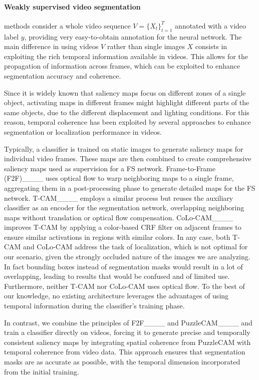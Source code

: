 \paragraph{Weakly supervised video segmentation} methods consider a whole video sequence \( V = \{X_t\}_{t=1}^T \) annotated with a video label $y$, providing very easy-to-obtain annotation for the neural network. The main difference in using videos $V$ rather than single images $X$ consists in exploiting the rich temporal information available in videos. This %
allows for the propagation of information across frames, which can be exploited to enhance segmentation accuracy and coherence.

Since it is widely known that saliency maps focus on different zones of a single object, activating maps in different frames might highlight different parts of the same objects, due to the different displacement and lighting conditions. For this reason, temporal coherence has been exploited by several approaches to enhance segmentation or localization performance in videos. 

Typically, a classifier is trained on static images to generate saliency maps for individual video frames. These maps are then combined to create comprehensive saliency maps used as supervision for a FS network. Frame-to-Frame (F2F)____ uses optical flow to warp neighboring maps to a single frame, aggregating them in a post-processing phase to generate detailed maps for the FS network. T-CAM____ employs a similar process but reuses the auxiliary classifier as an encoder for the segmentation network, overlapping neighboring maps without translation or optical flow compensation. CoLo-CAM____ improves T-CAM by applying a color-based CRF filter on adjacent frames to ensure similar activations in regions with similar colors. In any case, both T-CAM and CoLo-CAM address the task of localization, which is not optimal for our scenario, given the strongly occluded nature of the images we are analyzing. In fact bounding boxes instead of segmentation masks would result in a lot of overlapping, leading to results that would be confused and of limited use. Furthermore, neither T-CAM nor CoLo-CAM uses optical flow. To the best of our knowledge, no existing architecture leverages the advantages of using temporal information during the classifier's training phase. 

In contrast, we combine the principles of F2F____ and PuzzleCAM____ and train a classifier directly on videos, forcing it to generate precise and temporally consistent saliency maps by integrating spatial coherence from PuzzleCAM with temporal coherence from video data.  This approach ensures that segmentation masks are as accurate as possible, with the temporal dimension incorporated from the initial training.